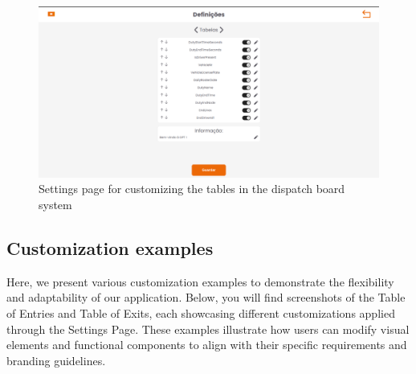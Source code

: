 \documentclass[10pt]{article}
\begin{document}
        \begin{figure}[h]
            \centering
            \includegraphics[width=1\textwidth]{tabelas}
            \caption{Settings page for customizing the tables in the dispatch board system}
            \label{fig:settings_tables}
        \end{figure}

        \subsection{Customization examples}

        Here, we present various customization examples to demonstrate the flexibility and adaptability of our application. Below, you will find screenshots of the Table of Entries and Table of Exits, each showcasing different customizations applied through the Settings Page. These examples illustrate how users can modify visual elements and functional components to align with their specific requirements and branding guidelines.
\end{document}
